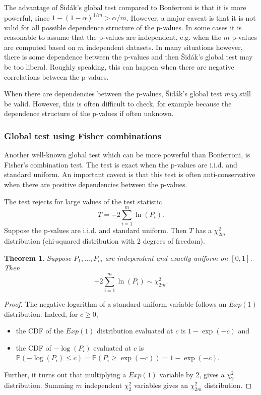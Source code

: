 \documentclass[11pt]{article}
\theoremstyle{plain}
\newtheorem{theorem}{Theorem}[section]
\theoremstyle{definition}
\newcommand{\pr}{\mathbb{P}}
\begin{document}
The advantage of \v{S}id\'{a}k's global test compared to Bonferroni is that it is more powerful, since $1-(1-\alpha)^{1/m} > \alpha/m$. However, a major caveat is that it is not valid for all possible dependence structure of the p-values. In some cases it is reasonable to assume that the p-values are independent, e.g. when the $m$ p-values are computed based on $m$ independent datasets. In many situations however, there is some dependence between the p-values and then \v{S}id\'{a}k's global test may be too liberal. Roughly speaking, this can happen when there are negative correlations between the p-values.

When there are dependencies between the p-values, \v{S}id\'{a}k's global test \emph{may} still be valid. However, this is often difficult to check, for example because the dependence structure of the p-values if often unknown.



\subsubsection{Global test using Fisher combinations}
Another well-known global test which can be more powerful than Bonferroni, is Fisher's combination test. The test is exact when the p-values are i.i.d. and standard uniform.
 An important caveat is that this test is often anti-conservative when there are positive dependencies between the p-values.

 The test rejects for large values of the test statistic
$$T = -2\sum_{i=1}^m \ln(P_i).$$ Suppose the p-values are i.i.d. and standard uniform.  Then $T$ has a  $\chi^2_{2m}$ distribution (chi-squared distribution with 2 degrees of freedom). 

\begin{theorem}
Suppose $P_1,...,P_m$ are independent and exactly uniform on $[0,1]$.
Then $$ -2\sum_{i=1}^m \ln(P_i) \sim \chi^2_{2m}.$$
\end{theorem}
\begin{proof}
The negative logarithm of a standard uniform variable follows an $Exp(1)$ distribution. Indeed, for $c\geq 0$,
\begin{itemize}
\item the CDF of the $Exp(1)$ distribution evaluated at $c$ is $1-\exp(-c)$ and 
\item the CDF of $-\log(P_i)$ evaluated at $c$ is $\pr(-\log(P_i)\leq c)  =\pr(P_i\geq \exp(-c))=1-\exp(-c).$
\end{itemize}
Further, it turns out that multiplying a $Exp(1)$ variable  by 2, gives a $\chi^2_{2}$ distribution. Summing $m$ independent $\chi^2_{2}$ variables gives an $\chi^2_{2m}$ distribution.
\end{proof}
\end{document}
